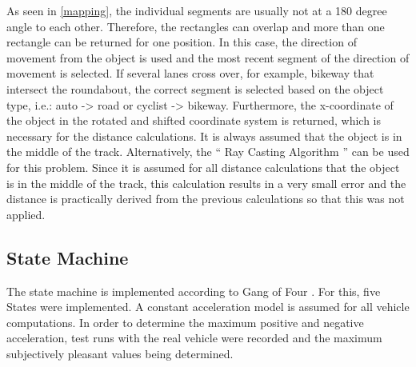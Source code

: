 \documentclass[11pt,oneside,openright]{mpreport}
\begin{document}
As seen in \cref{mapping}, the individual segments are usually not at a 180 degree angle to each other. Therefore, the rectangles can overlap and more than one rectangle can 
be returned for one position. In this case, the direction of movement from the object is used and the most recent segment of the direction of movement is selected.
If several lanes cross over, for example, bikeway that intersect the roundabout, the correct segment is selected based on the object type, i.e.: auto -> road or cyclist -> bikeway.
Furthermore, the x-coordinate of the object in the rotated and shifted coordinate system is returned, which is necessary for the distance calculations. It is always assumed that the
object is in the middle of the track. Alternatively, the `` Ray Casting Algorithm '' \cite{Galetzka2017} can be used for this problem. Since it is assumed for all
distance calculations that the object is in the middle of the track, this calculation results in a very small error and the distance is practically derived from the
previous calculations so that this was not applied.

\subsection{State Machine} 
The state machine is implemented according to Gang of Four \cite{lester2008gang}. For this, five States were implemented.
A constant acceleration model is assumed for all vehicle computations. In order to determine the maximum positive and negative acceleration, 
test runs with the real vehicle  were recorded and the maximum subjectively pleasant values being determined. 
\end{document}
